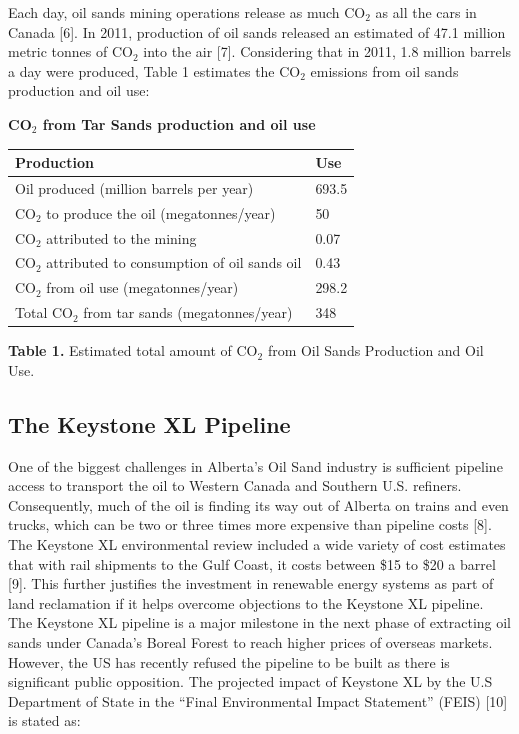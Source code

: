 \documentclass[11pt]{article}
\begin{document}
Each day, oil sands mining operations release as much CO$_2$ as all the cars in Canada [6]. In 2011, production of oil sands released an estimated of 47.1 million metric tonnes of CO$_2$ into the air [7]. Considering that in 2011, 1.8 million barrels a day were produced, Table 1 estimates the CO$_2$ emissions from oil sands production and oil use: \\

\newpage

\begin{center}
{\bf CO$_2$ from Tar Sands production and oil use} \\
\begin{tabular}{|l|l|}
\hline
\cellcolor[gray]{0.8} {\bf Production} & \cellcolor[gray]{0.8} {\bf Use} \\
\hline
Oil produced (million barrels per year) & 693.5\\
\hline
CO$_2$ to produce the oil (megatonnes/year) & 50 \\
\hline
\hspace{8.5em} CO$_2$ attributed to the mining & 0.07 \\
\hline
\hspace{1em} CO$_2$ attributed to consumption of oil sands oil & 0.43\\
\hline
CO$_2$ from oil use (megatonnes/year)  & 298.2 \\
\hline  
Total CO$_2$ from tar sands (megatonnes/year) & 348 \\
\hline
\end{tabular}
\end{center}
\begin{center}
{\bf Table 1.} Estimated total amount of CO$_2$ from Oil Sands Production and Oil Use.
\end{center}

\subsection{The Keystone XL Pipeline}
One of the biggest challenges in Alberta's Oil Sand industry is sufficient pipeline access to transport the oil to Western Canada and Southern U.S. refiners. Consequently, much of the oil is finding its way out of Alberta on trains and even trucks, which can be two or three times more expensive than pipeline costs [8]. The Keystone XL environmental review included a wide variety of cost estimates that with rail shipments to the Gulf Coast, it costs between \$15 to \$20 a barrel [9]. This further justifies the investment in renewable energy systems as part of land reclamation if it helps overcome objections to the Keystone XL pipeline.\\
The Keystone XL pipeline is a major milestone in the next phase of extracting oil sands under Canada's Boreal Forest to reach higher prices of overseas markets. However, the US has recently refused the pipeline to be built as there is significant public opposition.  The projected impact of Keystone XL by the U.S Department of State in the ``Final Environmental Impact Statement'' (FEIS) [10] is stated as:
\end{document}
